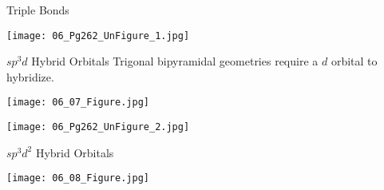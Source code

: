 \documentclass[handout]{beamer}
\begin{document}
\begin{frame}{Triple Bonds}
	\begin{center}
		\texttt{[image: 06\_Pg262\_UnFigure\_1.jpg]}
	\end{center}
\end{frame}



\begin{frame}[allowframebreaks]{$sp^3d$ Hybrid Orbitals}
	Trigonal bipyramidal geometries require a $d$ orbital to hybridize.

	\begin{center}
		\texttt{[image: 06\_07\_Figure.jpg]}
	\end{center}

	\framebreak

	\begin{center}
		\texttt{[image: 06\_Pg262\_UnFigure\_2.jpg]}
	\end{center}
\end{frame}

\begin{frame}[c]{$sp^3d^2$ Hybrid Orbitals}
	\begin{center}
		\texttt{[image: 06\_08\_Figure.jpg]}
	\end{center}
\end{frame}
\end{document}

